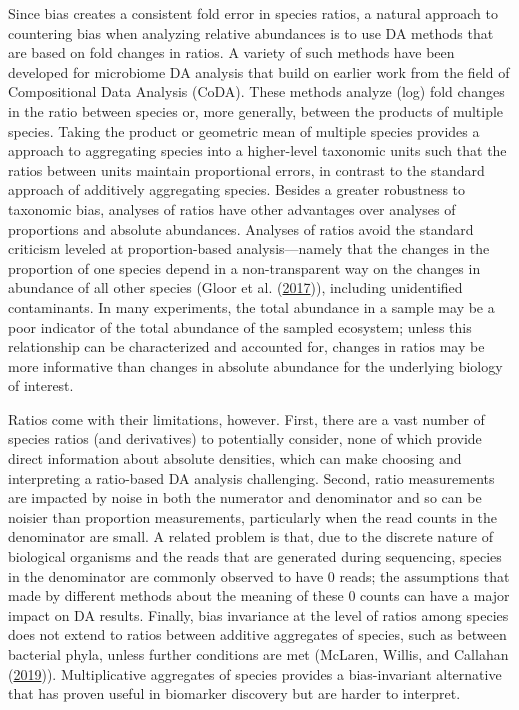 \documentclass[
]{article}
\begin{document}
Since bias creates a consistent fold error in species ratios, a natural approach to countering bias when analyzing relative abundances is to use DA methods that are based on fold changes in ratios.
A variety of such methods have been developed for microbiome DA analysis that build on earlier work from the field of Compositional Data Analysis (CoDA).
These methods analyze (log) fold changes in the ratio between species or, more generally, between the products of multiple species.
Taking the product or geometric mean of multiple species provides a approach to aggregating species into a higher-level taxonomic units such that the ratios between units maintain proportional errors, in contrast to the standard approach of additively aggregating species.
Besides a greater robustness to taxonomic bias, analyses of ratios have other advantages over analyses of proportions and absolute abundances.
Analyses of ratios avoid the standard criticism leveled at proportion-based analysis---namely that the changes in the proportion of one species depend in a non-transparent way on the changes in abundance of all other species (Gloor et al. (\protect\hyperlink{ref-gloor2017micr}{2017})), including unidentified contaminants.
In many experiments, the total abundance in a sample may be a poor indicator of the total abundance of the sampled ecosystem; unless this relationship can be characterized and accounted for, changes in ratios may be more informative than changes in absolute abundance for the underlying biology of interest.

Ratios come with their limitations, however.
First, there are a vast number of species ratios (and derivatives) to potentially consider, none of which provide direct information about absolute densities, which can make choosing and interpreting a ratio-based DA analysis challenging.
Second, ratio measurements are impacted by noise in both the numerator and denominator and so can be noisier than proportion measurements, particularly when the read counts in the denominator are small.
A related problem is that, due to the discrete nature of biological organisms and the reads that are generated during sequencing, species in the denominator are commonly observed to have 0 reads; the assumptions that made by different methods about the meaning of these 0 counts can have a major impact on DA results.
Finally, bias invariance at the level of ratios among species does not extend to ratios between additive aggregates of species, such as between bacterial phyla, unless further conditions are met (McLaren, Willis, and Callahan (\protect\hyperlink{ref-mclaren2019cons}{2019})).
Multiplicative aggregates of species provides a bias-invariant alternative that has proven useful in biomarker discovery but are harder to interpret.
\end{document}
